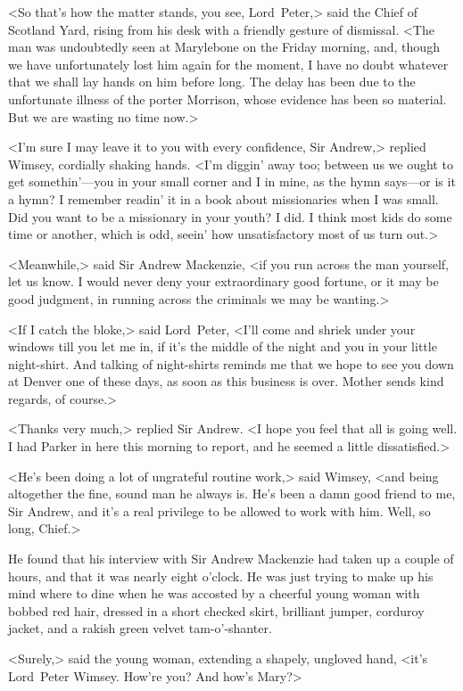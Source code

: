 <So that's how the matter stands, you see, Lord~Peter,> said the Chief of Scotland Yard, rising from his desk with a friendly gesture of dismissal. <The man was undoubtedly seen at Marylebone on the Friday morning, and, though we have unfortunately lost him again for the moment, I have no doubt whatever that we shall lay hands on him before long. The delay has been due to the unfortunate illness of the porter Morrison, whose evidence has been so material. But we are wasting no time now.>

<I'm sure I may leave it to you with every confidence, Sir Andrew,> replied Wimsey, cordially shaking hands. <I'm diggin' away too; between us we ought to get somethin'—you in your small corner and I in mine, as the hymn says—or is it a hymn? I remember readin' it in a book about missionaries when I was small. Did you want to be a missionary in your youth? I did. I think most kids do some time or another, which is odd, seein' how unsatisfactory most of us turn out.>

<Meanwhile,> said Sir Andrew Mackenzie, <if you run across the man yourself, let us know. I would never deny your extraordinary good fortune, or it may be good judgment, in running across the criminals we may be wanting.>

<If I catch the bloke,> said Lord~Peter, <I'll come and shriek under your windows till you let me in, if it's the middle of the night and you in your little night-shirt. And talking of night-shirts reminds me that we hope to see you down at Denver one of these days, as soon as this business is over. Mother sends kind regards, of course.>

<Thanks very much,> replied Sir Andrew. <I hope you feel that all is going well. I had Parker in here this morning to report, and he seemed a little dissatisfied.>

<He's been doing a lot of ungrateful routine work,> said Wimsey, <and being altogether the fine, sound man he always is. He's been a damn good friend to me, Sir Andrew, and it's a real privilege to be allowed to work with him. Well, so long, Chief.>

He found that his interview with Sir Andrew Mackenzie had taken up a couple of hours, and that it was nearly eight o'clock. He was just trying to make up his mind where to dine when he was accosted by a cheerful young woman with bobbed red hair, dressed in a short checked skirt, brilliant jumper, corduroy jacket, and a rakish green velvet tam-o'-shanter.

<Surely,> said the young woman, extending a shapely, ungloved hand, <it's Lord~Peter Wimsey. How're you? And how's Mary?>

